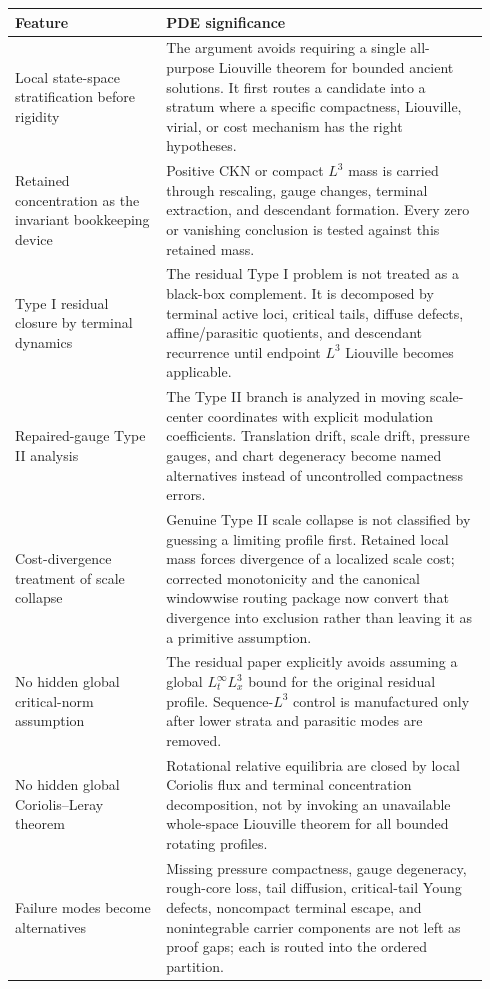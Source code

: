 \documentclass[11pt]{amsart}
\begin{document}
\begin{longtable}{@{}>{\raggedright\arraybackslash}p{0.30\linewidth}>{\raggedright\arraybackslash}p{0.64\linewidth}@{}}
\toprule
\textbf{Feature} & \textbf{PDE significance} \\
\midrule
\endhead
Local state-space stratification before rigidity & The argument avoids requiring a single all-purpose Liouville theorem for bounded ancient solutions.  It first routes a candidate into a stratum where a specific compactness, Liouville, virial, or cost mechanism has the right hypotheses. \\
Retained concentration as the invariant bookkeeping device & Positive CKN or compact \(L^3\) mass is carried through rescaling, gauge changes, terminal extraction, and descendant formation.  Every zero or vanishing conclusion is tested against this retained mass. \\
Type I residual closure by terminal dynamics & The residual Type I problem is not treated as a black-box complement.  It is decomposed by terminal active loci, critical tails, diffuse defects, affine/parasitic quotients, and descendant recurrence until endpoint \(L^3\) Liouville becomes applicable. \\
Repaired-gauge Type II analysis & The Type II branch is analyzed in moving scale-center coordinates with explicit modulation coefficients.  Translation drift, scale drift, pressure gauges, and chart degeneracy become named alternatives instead of uncontrolled compactness errors. \\
Cost-divergence treatment of scale collapse & Genuine Type II scale collapse is not classified by guessing a limiting profile first.  Retained local mass forces divergence of a localized scale cost; corrected monotonicity and the canonical windowwise routing package now convert that divergence into exclusion rather than leaving it as a primitive assumption. \\
No hidden global critical-norm assumption & The residual paper explicitly avoids assuming a global \(L^\infty_tL^3_x\) bound for the original residual profile.  Sequence-\(L^3\) control is manufactured only after lower strata and parasitic modes are removed. \\
No hidden global Coriolis--Leray theorem & Rotational relative equilibria are closed by local Coriolis flux and terminal concentration decomposition, not by invoking an unavailable whole-space Liouville theorem for all bounded rotating profiles. \\
Failure modes become alternatives & Missing pressure compactness, gauge degeneracy, rough-core loss, tail diffusion, critical-tail Young defects, noncompact terminal escape, and nonintegrable carrier components are not left as proof gaps; each is routed into the ordered partition. \\
\bottomrule
\end{longtable}
\end{document}

